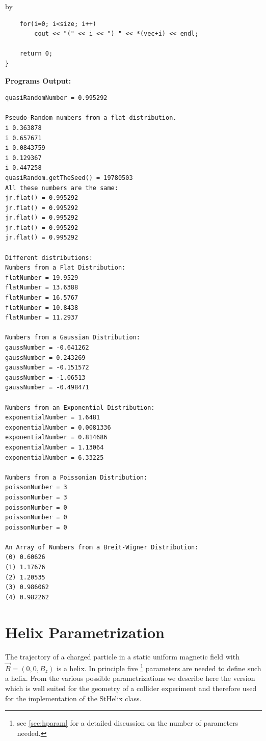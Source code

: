 \documentclass[twoside]{article}
\newcommand{\name}[1]{\textsf{#1}}%
\newcommand{\entrylabel}[1]{\mbox{\textbf{{#1}}}\hfil}%
\newenvironment{entry}
{\begin{list}{}%
    {\renewcommand{\makelabel}{\entrylabel}%
     \setlength{\labelwidth}{90pt}%
     \setlength{\leftmargin}{\labelwidth}
     \advance\leftmargin by \labelsep%
      }%
    }%
  {\end{list}}
\newcommand{\Entrylabel}[1]%
{\raisebox{0pt}[1ex][0pt]{\makebox[\labelwidth][l]%
    {\parbox[t]{\labelwidth}{\hspace{0pt}\textbf{{#1}}}}}}
\newenvironment{Entry}%
{\renewcommand{\entrylabel}{\Entrylabel}\begin{entry}}%
  {\end{entry}}
\begin{document}
\begin{description}
\begin{Entry}
{\begin{verbatim}
    for(i=0; i<size; i++)
        cout << "(" << i << ") " << *(vec+i) << endl;   
    
    return 0;
}
\end{verbatim}
}%
{\bf Programs Output:}
{\footnotesize
\begin{verbatim}
quasiRandomNumber = 0.995292

Pseudo-Random numbers from a flat distribution.
i 0.363878
i 0.657671
i 0.0843759
i 0.129367
i 0.447258
quasiRandom.getTheSeed() = 19780503
All these numbers are the same:
jr.flat() = 0.995292
jr.flat() = 0.995292
jr.flat() = 0.995292
jr.flat() = 0.995292
jr.flat() = 0.995292

Different distributions:
Numbers from a Flat Distribution:
flatNumber = 19.9529
flatNumber = 13.6388
flatNumber = 16.5767
flatNumber = 10.8438
flatNumber = 11.2937

Numbers from a Gaussian Distribution:
gaussNumber = -0.641262
gaussNumber = 0.243269
gaussNumber = -0.151572
gaussNumber = -1.06513
gaussNumber = -0.498471

Numbers from an Exponential Distribution:
exponentialNumber = 1.6481
exponentialNumber = 0.0081336
exponentialNumber = 0.814686
exponentialNumber = 1.13064
exponentialNumber = 6.33225

Numbers from a Poissonian Distribution:
poissonNumber = 3
poissonNumber = 3
poissonNumber = 0
poissonNumber = 0
poissonNumber = 0

An Array of Numbers from a Breit-Wigner Distribution:
(0) 0.60626
(1) 1.17676
(2) 1.20535
(3) 0.986062
(4) 0.982262
\end{verbatim}
} %

\end{Entry}
\clearpage

%
%

\appendix
\section{Helix Parametrization}
\label{app:helix}  
The trajectory of a charged particle in a static uniform magnetic
field with $\vec{B} = (0, 0, B_z)$ is a helix. In principle five
\footnote{see \ref{sec:hparam} for a detailed discussion on the number of parameters needed.}
parameters are needed to define such a helix. From the various
possible parametrizations we describe here the version which is well
suited for the geometry of a collider experiment and therefore used
for the implementation of the \name{StHelix} class. 


\end{description}
\end{document}
